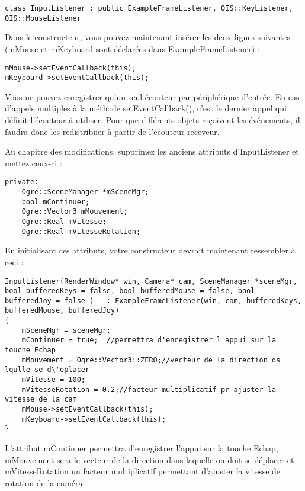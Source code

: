 \begin{lstlisting}[caption={Classes m\`eres pour gestion des Listeners}]
class InputListener : public ExampleFrameListener, OIS::KeyListener, OIS::MouseListener
\end{lstlisting}

Dans le constructeur, vous pouvez maintenant ins\'erer les deux lignes suivantes (mMouse et mKeyboard sont d\'eclar\'ees dans ExampleFrameListener) :

\begin{lstlisting}[caption={Enregistrement des listener}]
mMouse->setEventCallback(this);
mKeyboard->setEventCallback(this);
\end{lstlisting}

Vous ne pouvez enregistrer qu'un seul \'ecouteur par p\'eriph\'erique d'entr\'ee. En cas d'appels multiples \`a la m\'ethode setEventCallback(), c'est le dernier appel qui d\'efinit l'\'ecouteur \`a utiliser. Pour que diff\'erents objets re\c{c}oivent les \'ev\'enements, il faudra donc les redistribuer \`a partir de l'\'ecouteur receveur.

Au chapitre des modifications, supprimez les anciens attributs d'InputListener et mettez ceux-ci :

\begin{lstlisting}[caption={Attributs d'InputListener}]
private:
    Ogre::SceneManager *mSceneMgr;
    bool mContinuer;
    Ogre::Vector3 mMouvement;
    Ogre::Real mVitesse;
    Ogre::Real mVitesseRotation;
\end{lstlisting}

En initialisant ces attributs, votre constructeur devrait maintenant ressembler \`a ceci :

\begin{lstlisting}[caption={Constructeur d'InputListener}]
InputListener(RenderWindow* win, Camera* cam, SceneManager *sceneMgr, bool bufferedKeys = false, bool bufferedMouse = false, bool bufferedJoy = false )   : ExampleFrameListener(win, cam, bufferedKeys, bufferedMouse, bufferedJoy)
{
    mSceneMgr = sceneMgr;
    mContinuer = true;  //permettra d'enregistrer l'appui sur la touche Echap
    mMouvement = Ogre::Vector3::ZERO;//vecteur de la direction ds lqulle se d\'eplacer
    mVitesse = 100;
    mVitesseRotation = 0.2;//facteur multiplicatif pr ajuster la vitesse de la cam 
    mMouse->setEventCallback(this);
    mKeyboard->setEventCallback(this);
}
\end{lstlisting}

L'attribut mContinuer permettra d'enregistrer l'appui sur la touche Echap, mMouvement sera le vecteur de la direction dans laquelle on doit se d\'eplacer et mVitesseRotation un facteur multiplicatif permettant d'ajuster la vitesse de rotation de la cam\'era.

